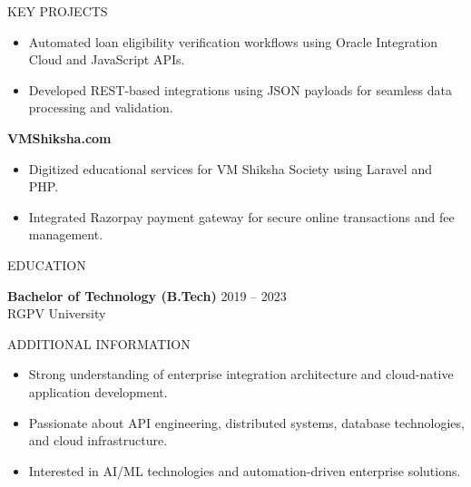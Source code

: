 \documentclass{resume}
\begin{document}
\begin{rSection}{KEY PROJECTS}
\begin{itemize}[leftmargin=*]

\item Automated loan eligibility verification workflows using Oracle Integration Cloud and JavaScript APIs.

\item Developed REST-based integrations using JSON payloads for seamless data processing and validation.

\end{itemize}


\textbf{VMShiksha.com}

\begin{itemize}[leftmargin=*]

\item Digitized educational services for VM Shiksha Society using Laravel and PHP.

\item Integrated Razorpay payment gateway for secure online transactions and fee management.

\end{itemize}

\end{rSection}


\begin{rSection}{EDUCATION}

\textbf{Bachelor of Technology (B.Tech)} \hfill 2019 -- 2023 \\
RGPV University

\end{rSection}


\begin{rSection}{ADDITIONAL INFORMATION}

\begin{itemize}[leftmargin=*]

\item Strong understanding of enterprise integration architecture and cloud-native application development.

\item Passionate about API engineering, distributed systems, database technologies, and cloud infrastructure.

\item Interested in AI/ML technologies and automation-driven enterprise solutions.

\end{itemize}

\end{rSection}
\end{document}
